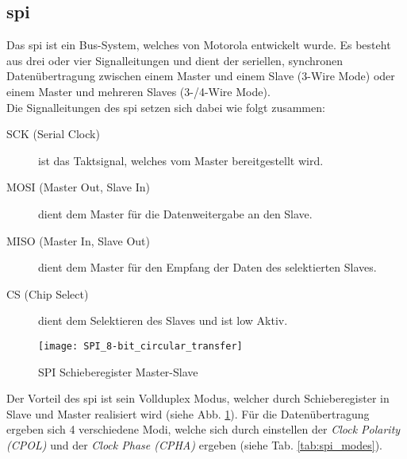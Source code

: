 \subsection{\acl{spi}}\label{subsec:spi}
Das \ac{spi} ist ein Bus-System, welches von Motorola entwickelt wurde. Es besteht aus drei oder vier Signalleitungen und dient der seriellen, synchronen Datenübertragung zwischen einem Master und einem Slave (3-Wire Mode) oder einem Master und mehreren Slaves (3-/4-Wire Mode). \\
Die Signalleitungen des \ac{spi} setzen sich dabei wie folgt zusammen:
\begin{description}
\item[SCK (Serial Clock)] ist das Taktsignal, welches vom Master bereitgestellt wird.
\item[MOSI (Master Out, Slave In)] dient dem Master für die Datenweitergabe an den Slave. 
\item[MISO (Master In, Slave Out)] dient dem Master für den Empfang der Daten des selektierten Slaves.
\item[CS (Chip Select)] dient dem Selektieren des Slaves und ist low Aktiv.
\end{description}
\begin{figure}[h!t]
	\centering
  	\texttt{[image: SPI\_8-bit\_circular\_transfer]}
  	\caption{SPI Schieberegister Master-Slave}
  	\label{fig:SPI_Shift}
\end{figure}
Der Vorteil des \ac{spi} ist sein Vollduplex Modus, welcher durch Schieberegister in Slave und Master realisiert wird (siehe Abb. \ref{fig:SPI_Shift}). Für die Datenübertragung ergeben sich 4 verschiedene Modi, welche sich durch einstellen der \textit{Clock Polarity (CPOL)} und der \textit{Clock Phase (CPHA)} ergeben (siehe Tab. \ref{tab:spi_modes}). 
